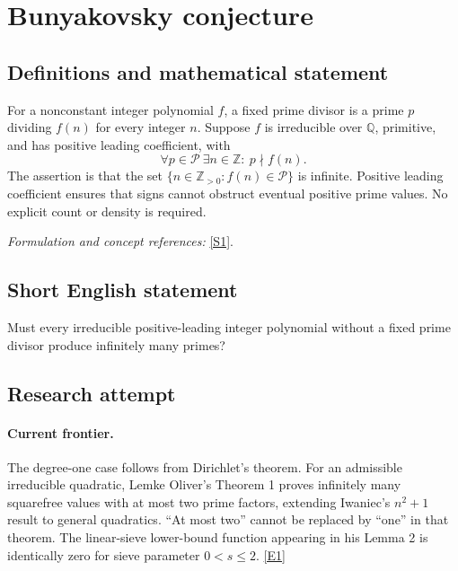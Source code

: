 \documentclass[11pt]{article}
\newcommand{\Z}{\mathbb{Z}}
\newcommand{\Q}{\mathbb{Q}}
\newcommand{\sref}[2]{\hyperlink{source:#1:#2}{[S#2]}}
\newcommand{\eref}[2]{\hyperlink{extra:#1:#2}{[E#2]}}
\newif\ifshowcatalogue
\newcommand{\cataloguescope}[1]{\ifshowcatalogue
 \paragraph{Exact scope in the supplied catalogue.}
 \begin{quote}\small #1\end{quote}\fi}
\begin{document}
\setcounter{section}{101}
\clearpage
\section{\texorpdfstring{Bunyakovsky conjecture}{Bunyakovsky conjecture}}\label{102}
\subsection{Definitions and mathematical statement}
For a nonconstant integer polynomial $f$, a fixed prime divisor is a prime $p$ dividing $f(n)$ for every integer $n$. Suppose $f$ is irreducible over $\Q$, primitive, and has positive leading coefficient, with
\[
 \forall p\in\mathcal P\ \exists n\in\Z:\ p\nmid f(n).
\]
The assertion is that the set $\{n\in\Z_{>0}:f(n)\in\mathcal P\}$ is infinite. Positive leading coefficient ensures that signs cannot obstruct eventual positive prime values. No explicit count or density is required.
\par\smallskip\textit{Formulation and concept references:} \sref{102}{1}.
\cataloguescope{Prove or disprove that every irreducible polynomial f in Z[x] with positive leading coefficient and no fixed prime divisor takes prime values for infinitely many positive integer inputs.}
\subsection{Short English statement}
Must every irreducible positive-leading integer polynomial without a fixed prime divisor produce infinitely many primes?
\subsection{Research attempt}

\paragraph{Current frontier.}
The degree-one case follows from Dirichlet's theorem. For an admissible
irreducible quadratic, Lemke Oliver's Theorem 1 proves infinitely many
squarefree values with at most two prime factors, extending Iwaniec's
$n^2+1$ result to general quadratics. ``At most two'' cannot be replaced by
``one'' in that theorem. The linear-sieve lower-bound function appearing in
his Lemma 2 is identically zero for sieve parameter $0<s\le2$.
\eref{102}{1}
\end{document}
